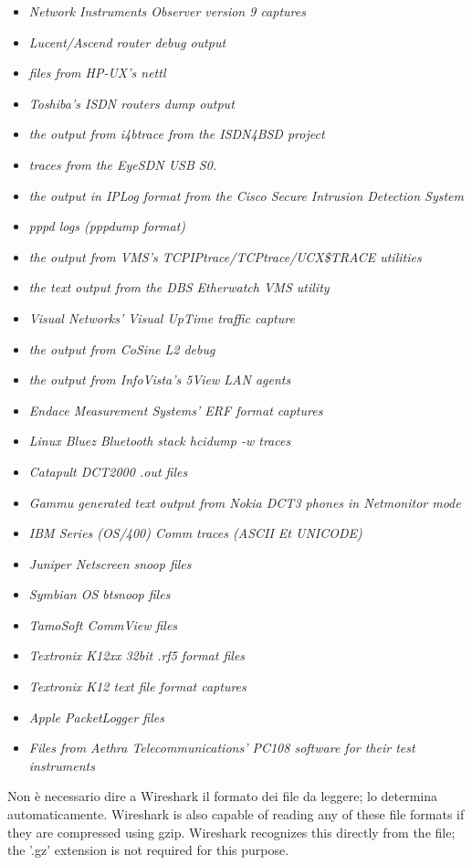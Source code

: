\documentclass[a4paper,11pt]{book}
\begin{document}
\begin{itemize}
\item \textit{Network Instruments Observer version 9 captures}
\item \textit{Lucent/Ascend router debug output}
\item \textit{files from HP-UX's nettl}
\item \textit{Toshiba's ISDN routers dump output}
\item \textit{the output from i4btrace from the ISDN4BSD project}
\item \textit{traces from the EyeSDN USB S0.}
\item \textit{the output in IPLog format from the Cisco Secure Intrusion Detection System}
\item \textit{pppd logs (pppdump format)}
\item \textit{the output from VMS's TCPIPtrace/TCPtrace/UCX\$TRACE utilities}
\item \textit{the text output from the DBS Etherwatch VMS utility}
\item \textit{Visual Networks' Visual UpTime traffic capture}
\item \textit{the output from CoSine L2 debug}
\item \textit{the output from InfoVista's 5View LAN agents}
\item \textit{Endace Measurement Systems' ERF format captures}
\item \textit{Linux Bluez Bluetooth stack hcidump -w traces}
\item \textit{Catapult DCT2000 .out files}
\item \textit{Gammu generated text output from Nokia DCT3 phones in Netmonitor mode}
\item \textit{IBM Series (OS/400) Comm traces (ASCII Et UNICODE)}
\item \textit{Juniper Netscreen snoop files}
\item \textit{Symbian OS btsnoop files}
\item \textit{TamoSoft CommView files}
\item \textit{Textronix K12xx 32bit .rf5 format files}
\item \textit{Textronix K12 text file format captures}
\item \textit{Apple PacketLogger files}
\item \textit{Files from Aethra Telecommunications' PC108 software for their test instruments}
\end{itemize}

Non è necessario dire a Wireshark  il formato dei file da leggere; lo determina automaticamente. Wireshark is also capable of reading any of these file formats if they are compressed using gzip. Wireshark recognizes this directly from the file; the '.gz' extension is not required for this purpose.
\end{document}
